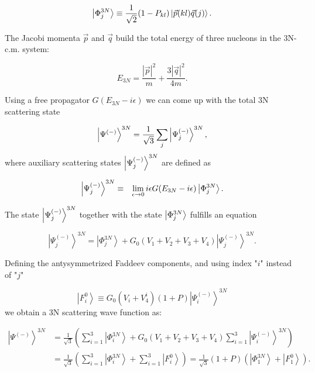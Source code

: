     \begin{equation}
        \ket{\Phi^{3N}_j} \equiv \frac{1}{\sqrt{2}}(1 - P_{kl})
        \ket{\vec{p}(kl)\vec{q}(j)}.\\
    \end{equation}

    The Jacobi momenta $\vec{p}$ and $\vec{q}$ build the total energy of three
    nucleons in the 3N-c.m. system:
    
    \begin{equation}
        E_{3N} = \frac{|\vec{p}|^2}{m} + \frac{3 |\vec{q}|^2}{4m}.
    \end{equation}
    
    Using a free propagator $G(E_{3N} - i\epsilon)$ we can come up with
    the total 3N scattering state

    \begin{equation}
        \ket{\Psi^{(-)}}^{3N} = \frac{1}{\sqrt{3}} \sum_j\ket{\Psi^{(-)}_j}^{3N},  
    \end{equation}
    where auxiliary scattering states $\ket{\Psi^{(-)}_j}^{3N}$ are defined as \cite{Glockle1983} 

    \begin{eqnarray}
        \ket{\Psi^{(-)}_j}^{3N}  &\equiv& \lim_{\epsilon \rightarrow 0}
        i \epsilon G(E_{3N} - i\epsilon)\ket{\Phi^{3N}_j}.
    \end{eqnarray}

    The state $\ket{\Psi^{(-)}_j}^{3N}$ together with the state $\ket{\Phi^{3N}_j}$ fulfills an equation \cite{Glockle1983}

    \begin{equation}
        \left|\Psi_j^{(-)}\right\rangle^{3 N}=\left|\Phi_j^{3 N}\right\rangle+
        G_0\left(V_1+V_2+V_3+V_4\right)\left|\Psi_j^{(-)}\right\rangle^{3 N}.
    \end{equation}

    Defining the antysymmetrized Faddeev components, and using index "$i$" instead of "$j$"

    \begin{equation}
        \left|F_i^0\right\rangle \equiv G_0\left(V_i+V_4^{i}\right)(1+P)\left|\Psi_i^{(-)}\right\rangle^{3 N}
        \label{faddeev_3n}
    \end{equation}
    we obtain a 3N scattering wave function as:

    \begin{equation}
        \begin{aligned}
            \left|\Psi^{(-)}\right\rangle^{3 N} & =\frac{1}{\sqrt{3}}\left(\sum_{i=1}^3\left|\Phi_i^{3 N}\right\rangle+G_0\left(V_1+V_2+V_3+V_4\right) \sum_{i=1}^3\left|\Psi_i^{(-)}\right\rangle^{3 N}\right) \\
            & =\frac{1}{\sqrt{3}}\left(\sum_{i=1}^3\left|\Phi_i^{3 N}\right\rangle+\sum_{i=1}^3\left|F_i^0\right\rangle\right)
            =\frac{1}{\sqrt{3}}(1+P)\left(\left|\Phi_1^{3 N}\right\rangle+\left|F_1^0\right\rangle\right) .
        \end{aligned}
        \label{3n_scat_psi}
    \end{equation}

